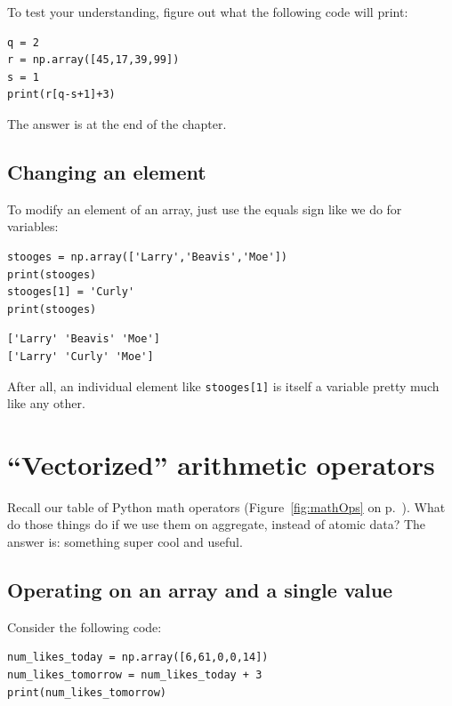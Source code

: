 To test your understanding, figure out what the following code will print:

\label{indexTest}
\begin{Verbatim}[fontsize=\small,samepage=true,frame=single,framesep=3mm]
q = 2
r = np.array([45,17,39,99])
s = 1
print(r[q-s+1]+3)
\end{Verbatim}

The answer is at the end of the chapter.

\subsection{Changing an element}

To modify an element of an array, just use the equals sign like we do for
variables:

\begin{Verbatim}[fontsize=\small,samepage=true,frame=single,framesep=3mm]
stooges = np.array(['Larry','Beavis','Moe'])
print(stooges)
stooges[1] = 'Curly'
print(stooges)
\end{Verbatim}

\begin{Verbatim}[fontsize=\small,samepage=true,frame=leftline,framesep=5mm,framerule=1mm]
['Larry' 'Beavis' 'Moe']
['Larry' 'Curly' 'Moe']
\end{Verbatim}

After all, an individual element like \texttt{stooges[1]} is itself a variable
pretty much like any other.


\section{``Vectorized'' arithmetic operators}

Recall our table of Python math operators (Figure~\ref{fig:mathOps} on
p.~\pageref{fig:mathOps}). What do those things do if we use them on aggregate,
instead of atomic data? The answer is: something super cool and useful.

\subsection{Operating on an array and a single value}

Consider the following code:

\label{vectorizedArrayIntExample}
\begin{Verbatim}[fontsize=\small,samepage=true,frame=single,framesep=3mm]
num_likes_today = np.array([6,61,0,0,14])
num_likes_tomorrow = num_likes_today + 3
print(num_likes_tomorrow)
\end{Verbatim}

